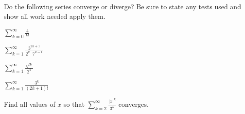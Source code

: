 \documentclass{exam}[12pt]
\begin{document}
\pagestyle{head}

\extraheadheight{.3in}
\extrafootheight{-.3in} 


\vspace{.2in}
\large{

Do the following series converge or diverge? Be sure to state any
tests used and show all work needed apply them.

\begin{questions}

\question $\displaystyle
\sum_{k=0}^\infty \frac{4}{k!} $ 
\vspace{1in}

\question $\displaystyle
\sum_{k=1}^\infty \frac{3^{2k+1}}{2^k \; \;7^{k-1}} $ 
\vspace{1in}

\question $\displaystyle
\sum_{k=1}^\infty \frac{\sqrt{ k}}{2^k } $ 
\vspace{1in}

\question $\displaystyle
\sum_{k=1}^\infty \frac{3^k}{(2k +1)!} $ 
\vspace{1in}

\question Find all values of $x$ so that $\sum_{k=2}^\infty 
\frac{|x|^k}{3^k}$ converges.

\end{questions}

}
\end{document}
